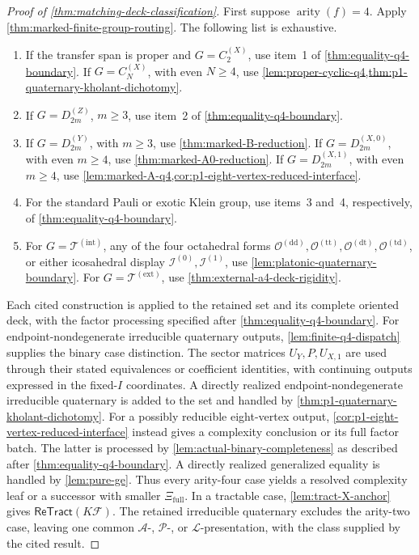 \documentclass[11pt,letterpaper,onecolumn]{article}
\theoremstyle{plain}
\theoremstyle{definition}
\theoremstyle{remark}
\newcommand{\cF}{\mathcal F}
\newcommand{\cA}{\mathscr A}
\newcommand{\cP}{\mathscr P}
\newcommand{\cL}{\mathscr L}
\newcommand{\ReTract}{\mathsf{ReTract}}
\newcommand{\DihZ}[1]{{D_{#1}^{(Z)}}}
\newcommand{\DihY}[1]{{D_{#1}^{(Y)}}}
\newcommand{\DihXzero}[1]{{D_{#1}^{(X,0)}}}
\newcommand{\DihXone}[1]{{D_{#1}^{(X,1)}}}
\newcommand{\CycX}[1]{{C_{#1}^{(X)}}}
\newcommand{\TetInt}{{\mathcal T^{(\mathrm{int})}}}
\newcommand{\TetExt}{{\mathcal T^{(\mathrm{ext})}}}
\newcommand{\OctDD}{{\mathcal O^{(\mathrm{dd})}}}
\newcommand{\OctTT}{{\mathcal O^{(\mathrm{tt})}}}
\newcommand{\OctDT}{{\mathcal O^{(\mathrm{dt})}}}
\newcommand{\OctTD}{{\mathcal O^{(\mathrm{td})}}}
\newcommand{\IcoZero}{{\mathcal I^{(0)}}}
\newcommand{\IcoOne}{{\mathcal I^{(1)}}}
\newcommand{\arity}{\operatorname{arity}}
\begin{document}
\begin{proof}[Proof of \cref{thm:matching-deck-classification}]
First suppose \(\arity(f)=4\).  Apply
\cref{thm:marked-finite-group-routing}. The following list is exhaustive.
\begin{enumerate}
\item If the transfer span is proper and \(G=\CycX{2}\), use item~1
      of \cref{thm:equality-q4-boundary}.  If \(G=\CycX{N}\), with even
      \(N\ge4\), use
      \cref{lem:proper-cyclic-q4,thm:p1-quaternary-kholant-dichotomy}.
\item If \(G=\DihZ{2m}\), \(m\ge3\), use item~2 of
      \cref{thm:equality-q4-boundary}.
\item If \(G=\DihY{2m}\), with \(m\ge3\), use
      \cref{thm:marked-B-reduction}.  If
      \(G=\DihXzero{2m}\), with even \(m\ge4\), use
      \cref{thm:marked-A0-reduction}.  If
      \(G=\DihXone{2m}\), with even \(m\ge4\), use
      \cref{lem:marked-A-q4,cor:p1-eight-vertex-reduced-interface}.
\item For the standard Pauli or exotic Klein group, use items~3 and~4,
      respectively, of \cref{thm:equality-q4-boundary}.
\item For \(G=\TetInt\), any of the four octahedral forms
      \(\OctDD,\OctTT,\OctDT,\OctTD\), or either icosahedral display
      \(\IcoZero,\IcoOne\), use
      \cref{lem:platonic-quaternary-boundary}. For
      \(G=\TetExt\), use
      \cref{thm:external-a4-deck-rigidity}.
\end{enumerate}
Each cited construction is applied to the retained set and its
complete oriented deck, with the factor processing specified after
\cref{thm:equality-q4-boundary}. For endpoint-nondegenerate irreducible
quaternary outputs, \cref{lem:finite-q4-dispatch} supplies the binary
case distinction. The sector matrices
\(U_{Y},P,U_{X,1}\) are used through their stated
equivalences or coefficient identities, with continuing outputs expressed
in the fixed-\(I\) coordinates.
A directly realized endpoint-nondegenerate irreducible quaternary is
added to the set and handled by \cref{thm:p1-quaternary-kholant-dichotomy}.
For a possibly reducible eight-vertex output,
\cref{cor:p1-eight-vertex-reduced-interface} instead gives a complexity
conclusion or its full factor batch. The latter is processed by
\cref{lem:actual-binary-completeness} as described after
\cref{thm:equality-q4-boundary}. A directly realized generalized equality
is handled by \cref{lem:pure-ge}.
Thus every arity-four case yields a resolved complexity leaf or a
successor with smaller \(\Xi_{\mathrm{full}}\). In a tractable case,
\cref{lem:tract-X-anchor} gives \(\ReTract(K\cF)\).
The retained irreducible quaternary excludes the arity-two case, leaving
one common \(\cA\)-, \(\cP\)-, or \(\cL\)-presentation, with the class
supplied by the cited result.


\end{proof}
\end{document}

